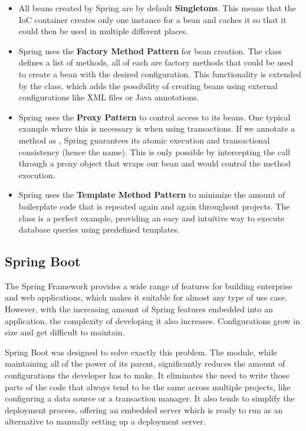\begin{itemize}
  \item All beans created by Spring are by default \textbf{Singletons}. This means that the IoC container creates only one instance for a bean and caches it so that it could then be used in multiple different places.
  \item Spring uses the \textbf{Factory Method Pattern} for bean creation. The  class defines a list of  methods, all of each are factory methods that could be used to create a bean with the desired configuration. This functionality is extended by the  class, which adds the possibility of creating beans using external configurations like XML files or Java annotations.
  \item Spring uses the \textbf{Proxy Pattern} to control access to its beans. One typical example where this is necessary is when using transactions. If we annotate a method as , Spring guarantees its atomic execution and transactional consistency (hence the name). This is only possible by intercepting the call through a proxy object that wraps our bean and would control the method execution.
  \item Spring uses the \textbf{Template Method Pattern} to minimize the amount of boilerplate code that is repeated again and again throughout projects. The  class is a perfect example, providing an easy and intuitive way to execute database queries using predefined templates.
\end{itemize}


\subsection{Spring Boot}
\label{subsection:springBoot}

The Spring Framework provides a wide range of features for building enterprise and web applications, which makes it suitable for almost any type of use case. However, with the increasing amount of Spring features embedded into an application, the complexity of developing it also increases. Configurations grow in size and get difficult to maintain.

Spring Boot was designed to solve exactly this problem. The module, while maintaining all of the power of its parent, significantly reduces the amount of configurations the developer has to make. It eliminates the need to write those parts of the code that always tend to be the same across multiple projects, like configuring a data source or a transaction manager. It also tends to simplify the deployment process, offering an embedded server which is ready to run as an alternative to manually setting up a deployment server.

